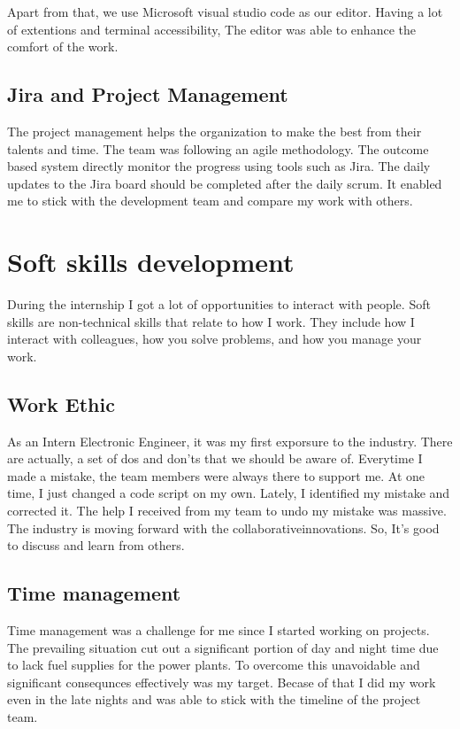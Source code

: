 \documentclass[twoside,12pt,times,onecolumn,a4paper]{report}
\begin{document}
Apart from that, we use Microsoft visual studio code as our editor. Having a lot of extentions and terminal accessibility, The editor was able to enhance the comfort of the work. 

\section{ Jira and Project Management}

The project management helps the organization to make the best from their talents and time. The team was following an agile methodology. The outcome based system directly monitor the progress using tools such as Jira. The daily updates to the Jira board should be completed after the daily scrum. It enabled me to stick with the development team and compare my work with others. 

\chapter{Soft skills development}

During the internship I got a lot of opportunities to interact with people. Soft skills are non-technical skills that relate to how I work. They include how I interact with colleagues, how you solve problems, and how you manage your work.

\section{Work Ethic}
As an Intern Electronic Engineer, it was my first exporsure to the industry. There are actually, a set of dos and don'ts that we should be aware of. Everytime I made a mistake, the team members were always there to support me. At one time, I just changed a code script on my own. Lately, I identified my mistake and corrected it. The help I received from my team to undo my mistake was massive. The industry is moving forward with the collaborativeinnovations. So, It's good to discuss and learn from others.  

\section{Time management}
Time management was a challenge for me since I started working on projects. The prevailing situation cut out a significant portion of day and night time due to lack fuel supplies for the power plants. To overcome this unavoidable and significant consequnces effectively was my target. Becase of that I did my work even in the late nights and was able to stick with the timeline of the project team. 
\end{document}
